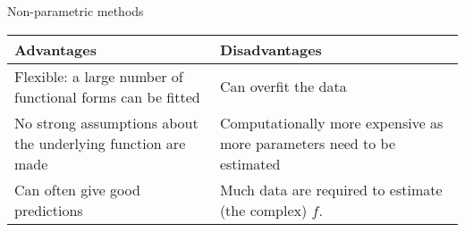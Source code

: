 \documentclass[ignorenonframetext,]{beamer}
\begin{document}
\begin{frame}

\begin{block}{Non-parametric methods}

\begin{longtable}[]{@{}ll@{}}
\toprule
\begin{minipage}[b]{0.47\columnwidth}\raggedright
Advantages\strut
\end{minipage} & \begin{minipage}[b]{0.47\columnwidth}\raggedright
Disadvantages\strut
\end{minipage}\tabularnewline
\midrule
\endhead
\begin{minipage}[t]{0.47\columnwidth}\raggedright
Flexible: a large number of functional forms can be fitted\strut
\end{minipage} & \begin{minipage}[t]{0.47\columnwidth}\raggedright
Can overfit the data\vspace{6mm}\strut
\end{minipage}\tabularnewline
\begin{minipage}[t]{0.47\columnwidth}\raggedright
No strong assumptions about the underlying function are made\strut
\end{minipage} & \begin{minipage}[t]{0.47\columnwidth}\raggedright
Computationally more expensive as more parameters need to be
estimated\vspace{3mm}\strut
\end{minipage}\tabularnewline
\begin{minipage}[t]{0.47\columnwidth}\raggedright
Can often give good predictions\strut
\end{minipage} & \begin{minipage}[t]{0.47\columnwidth}\raggedright
Much data are required to estimate (the complex) \(f\).\strut
\end{minipage}\tabularnewline
\bottomrule
\end{longtable}

\end{block}

\end{frame}
\end{document}
